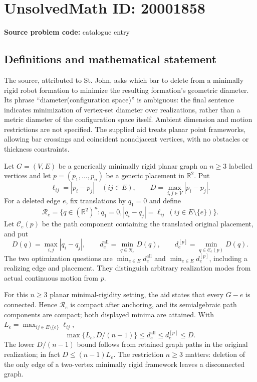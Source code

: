 \documentclass[11pt]{article}
\newcommand{\R}{\mathbb{R}}
\begin{document}
\section*{UnsolvedMath ID: 20001858}
\textbf{Source problem code:} catalogue entry
\subsection{Definitions and mathematical statement}
The source, attributed to St. John, asks which bar to delete from a minimally rigid robot formation to minimize the resulting formation's geometric diameter. Its phrase ``diameter(configuration space)'' is ambiguous: the final sentence indicates minimization of vertex-set diameter over realizations, rather than a metric diameter of the configuration space itself. Ambient dimension and motion restrictions are not specified. The supplied aid treats planar point frameworks, allowing bar crossings and coincident nonadjacent vertices, with no obstacles or thickness constraints.

Let \(G=(V,E)\) be a generically minimally rigid planar graph on \(n\geq3\) labelled vertices and let \(p=(p_1,\ldots,p_n)\) be a generic placement in \(\R^2\). Put
\[
 \ell_{ij}=|p_i-p_j|\quad(ij\in E),\qquad
 D=\max_{i,j\in V}|p_i-p_j|.
\]
For a deleted edge \(e\), fix translations by \(q_1=0\) and define
\[
 \mathcal R_e=\{q\in(\R^2)^n:q_1=0,
 |q_i-q_j|=\ell_{ij}\ (ij\in E\setminus\{e\})\}.
\]
Let \(\mathcal C_e(p)\) be the path component containing the translated original placement, and put
\[
 D(q)=\max_{i,j}|q_i-q_j|,\qquad
 d_e^{\mathrm{all}}=\min_{q\in\mathcal R_e}D(q),\qquad
 d_e^{[p]}=\min_{q\in\mathcal C_e(p)}D(q).
\]
The two optimization questions are \(\min_{e\in E}d_e^{\mathrm{all}}\) and \(\min_{e\in E}d_e^{[p]}\), including a realizing edge and placement. They distinguish arbitrary realization modes from actual continuous motion from \(p\).

For this \(n\geq3\) planar minimal-rigidity setting, the aid states that every \(G-e\) is connected. Hence \(\mathcal R_e\) is compact after anchoring, and its semialgebraic path components are compact; both displayed minima are attained. With \(L_e=\max_{ij\in E\setminus\{e\}}\ell_{ij}\),
\[
 \max\{L_e,D/(n-1)\}\leq d_e^{\mathrm{all}}
 \leq d_e^{[p]}\leq D.
\]
The lower \(D/(n-1)\) bound follows from retained graph paths in the original realization; in fact \(D\leq(n-1)L_e\). The restriction \(n\geq3\) matters: deletion of the only edge of a two-vertex minimally rigid framework leaves a disconnected graph.
\end{document}
